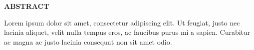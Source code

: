 \thispagestyle{plain}
\begin{center}
    \Large \textbf{\uppercase{Abstract}}
\end{center}

\vspace{1\baselineskip}

\noindent
Lorem ipsum dolor sit amet, consectetur adipiscing elit. Ut feugiat, justo nec lacinia aliquet, velit nulla tempus eros, ac faucibus purus mi a sapien. Curabitur ac magna ac justo lacinia consequat non sit amet odio.